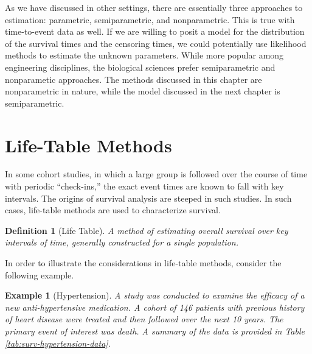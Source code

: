 \documentclass[
]{book}
\theoremstyle{plain}
\theoremstyle{mydefn}
\newtheorem{definition}{Definition}[chapter]
\theoremstyle{myexmpl}
\newtheorem{example}{Example}[chapter]
\theoremstyle{remark}
\begin{document}
As we have discussed in other settings, there are essentially three approaches to estimation: parametric, semiparametric, and nonparametric. This is true with time-to-event data as well. If we are willing to posit a model for the distribution of the survival times and the censoring times, we could potentially use likelihood methods to estimate the unknown parameters. While more popular among engineering disciplines, the biological sciences prefer semiparametric and nonparametic approaches. The methods discussed in this chapter are nonparametric in nature, while the model discussed in the next chapter is semiparametric.

\hypertarget{life-table-methods}{%
\section{Life-Table Methods}\label{life-table-methods}}

In some cohort studies, in which a large group is followed over the course of time with periodic ``check-ins,'' the exact event times are known to fall with key intervals. The origins of survival analysis are steeped in such studies. In such cases, life-table methods are used to characterize survival.

\begin{definition}[Life Table]
\protect\hypertarget{def:defn-life-table}{}{\label{def:defn-life-table} {} }A method of estimating overall survival over key intervals of time, generally constructed for a single population.
\end{definition}

In order to illustrate the considerations in life-table methods, consider the following example.

\begin{example}[Hypertension]
\protect\hypertarget{exm:surv-hyptertension}{}{\label{exm:surv-hyptertension} {} }A study was conducted to examine the efficacy of a new anti-hypertensive medication. A cohort of 146 patients with previous history of heart disease were treated and then followed over the next 10 years. The primary event of interest was death. A summary of the data is provided in Table \ref{tab:surv-hypertension-data}.
\end{example}
\end{document}
